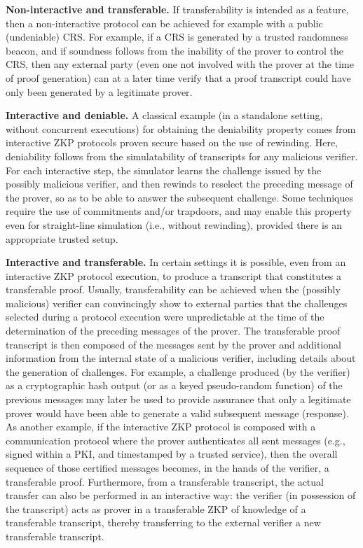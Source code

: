 \noindent\textbf{Non-interactive and transferable.}
	If transferability is intended as a feature, then a non-interactive protocol can be achieved for example with a public (undeniable) CRS. 
	For example, if a CRS is generated by a trusted randomness beacon, and if soundness follows from the inability of the prover to control the CRS, then any external party (even one not involved with the prover at the time of proof generation) can at a later time verify that a proof transcript could have only been generated by a legitimate prover.


\noindent\textbf{Interactive and deniable.}
	A classical example (in a standalone setting, without concurrent executions) for obtaining the deniability property comes from interactive ZKP protocols proven secure based on the use of rewinding.
	Here, deniability follows from the simulatability of transcripts for any malicious verifier.
	For each interactive step, the simulator learns the challenge issued by the possibly malicious verifier, and then rewinds to reselect the preceding message of the prover, so as to be able to answer the subsequent challenge.
	Some techniques require the use of commitments and/or trapdoors, and may enable this property even for straight-line simulation (i.e., without rewinding), provided there is an appropriate trusted setup.
\loosen


\noindent\textbf{Interactive and transferable.} 
	In certain settings it is possible, even from an interactive ZKP protocol execution, to produce a transcript that constitutes a transferable proof.
	Usually, transferability can be achieved when the (possibly malicious) verifier can convincingly show to external parties that the challenges selected during a protocol execution were unpredictable at the time of the determination of the preceding messages of the prover.
	The transferable proof transcript is then composed of the messages sent by the prover and additional information from the internal state of a malicious verifier, including details about the generation of challenges.
    For example, a challenge produced (by the verifier) as a cryptographic hash output (or as a keyed pseudo-random function) of the previous messages may later be used to provide assurance that only a legitimate prover would have been able to generate a valid subsequent message (response).
    As another example, if the interactive ZKP protocol is composed with a communication protocol where the prover authenticates all sent messages (e.g., signed within a PKI, and timestamped by a trusted service), then the overall sequence of those certified messages becomes, in the hands of the verifier, a transferable proof.
	Furthermore, from a transferable transcript, the actual transfer can also be performed in an interactive way: the verifier (in possession of the transcript) acts as prover in a transferable ZKP of knowledge of a transferable transcript, thereby transferring to the external verifier a new transferable transcript.
\loosen



